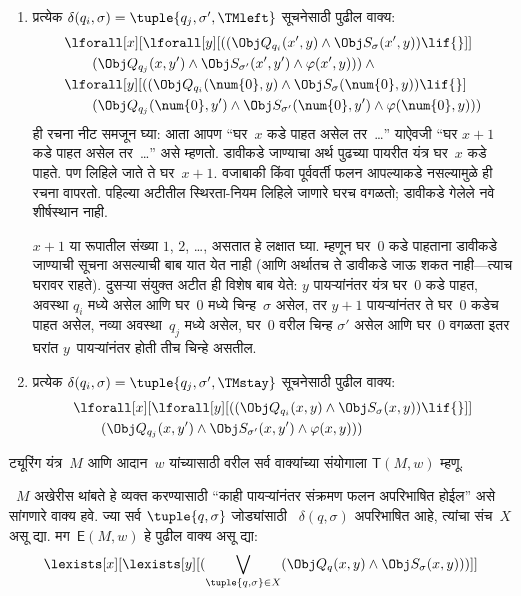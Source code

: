 \begin{enumerate}
\begin{enumerate}
\item \label{tur:und:rep:rep-left} प्रत्येक
  $\delta(q_i, \sigma) =
  \tuple{q_j, \sigma', \TMleft}$
  सूचनेसाठी पुढील वाक्य:
\begin{align*}
& \lforall[x][\lforall[y][
    ((\Obj Q_{q_i}(x', y) \land \Obj S_{\sigma}(x', y)) \lif {}]]\\
& \qquad   (\Obj Q_{q_j}(x, y') \land \Obj S_{\sigma'}(x', y') \land
\varphi(x', y))) \land {}\\
& \lforall[y][((\Obj Q_{q_i}(\num{0}, y) \land \Obj S_{\sigma}(\num{0},
    y)) \lif {}]\\
& \qquad (\Obj Q_{q_j}(\num{0}, y') \land \Obj S_{\sigma'}(\num{0},
  y') \land \varphi(\num{0}, y)))
\end{align*}
ही रचना नीट समजून घ्या:
आता आपण “घर~$x$ कडे
पाहत असेल तर~\dots”
याऐवजी “घर $x+1$
कडे पाहत असेल तर~\dots”
असे म्हणतो. डावीकडे
जाण्याचा अर्थ पुढच्या
पायरीत यंत्र घर~$x$
कडे पाहते. पण लिहिले
जाते ते घर~$x+1$.
वजाबाकी किंवा पूर्ववर्ती
फलन आपल्याकडे नसल्यामुळे
ही रचना वापरतो.
पहिल्या अटीतील स्थिरता-नियम
लिहिले जाणारे घरच
वगळतो; डावीकडे गेलेले
नवे शीर्षस्थान नाही.


$x+1$ या रूपातील संख्या
$1$, $2$, \dots,
असतात हे लक्षात घ्या.
म्हणून घर~$0$ कडे पाहताना
डावीकडे जाण्याची सूचना
असल्याची बाब यात येत
नाही (आणि अर्थातच ते
डावीकडे जाऊ शकत नाही---त्याच
घरावर राहते). दुसऱ्या
संयुक्त अटीत ही विशेष
बाब येते: $y$ पायऱ्यांनंतर
यंत्र घर~$0$ कडे पाहत,
अवस्था $q_i$ मध्ये असेल
आणि घर~$0$ मध्ये
चिन्ह~$\sigma$ असेल, तर
$y+1$ पायऱ्यांनंतर ते
घर~$0$ कडेच पाहत असेल,
नव्या अवस्था~$q_j$ मध्ये
असेल, घर~$0$ वरील
चिन्ह $\sigma'$ असेल
आणि घर~$0$ वगळता
इतर घरांत $y$~पायऱ्यांनंतर
होती तीच चिन्हे असतील.
\item \label{tur:und:rep:rep-stay} प्रत्येक
  $\delta(q_i, \sigma) =
  \tuple{q_j, \sigma', \TMstay}$
  सूचनेसाठी पुढील वाक्य:
\begin{align*}
& \lforall[x][\lforall[y][(
   (\Obj Q_{q_i}(x, y) \land \Obj S_{\sigma}(x, y)) \lif {}]] \\
&\qquad   (\Obj Q_{q_j}(x, y') \land \Obj S_{\sigma'}(x, y') \land
\varphi(x, y)))
\end{align*}
\end{enumerate}
\end{enumerate}
ट्यूरिंग यंत्र~$M$ आणि आदान~$w$
यांच्यासाठी वरील सर्व वाक्यांच्या संयोगाला $\mathsf{T}(M, w)$ म्हणू.

~$M$ अखेरीस थांबते हे व्यक्त
करण्यासाठी “काही पायऱ्यांनंतर
संक्रमण फलन अपरिभाषित होईल”
असे सांगणारे वाक्य हवे. ज्या सर्व
$\tuple{q, \sigma}$ जोड्यांसाठी
~$\delta(q, \sigma)$ अपरिभाषित
आहे, त्यांचा संच~$X$
असू द्या. मग~$\mathsf{E}(M, w)$
हे पुढील वाक्य
असू द्या:
\[\lexists[x][\lexists[y][(\bigvee_{\tuple{q, \sigma} \in
      X}(\Obj Q_q(x, y) \land \Obj S_\sigma(x, y)))]]
\]

